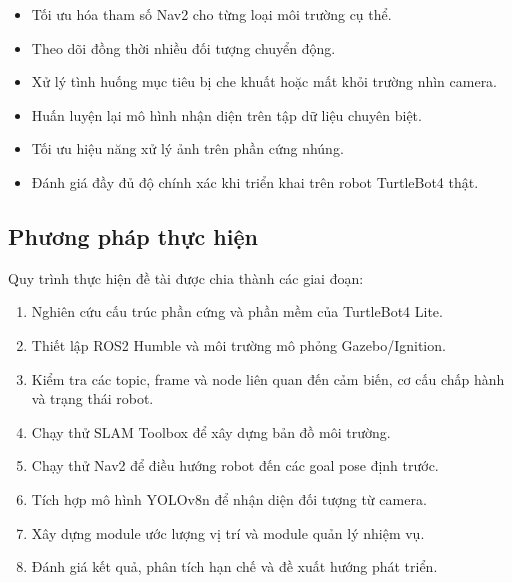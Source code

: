 \begin{itemize}
    \item Tối ưu hóa tham số Nav2 cho từng loại môi trường cụ thể.
    
    \item Theo dõi đồng thời nhiều đối tượng chuyển động.
    
    \item Xử lý tình huống mục tiêu bị che khuất hoặc mất khỏi trường nhìn camera.
    
    \item Huấn luyện lại mô hình nhận diện trên tập dữ liệu chuyên biệt.
    
    \item Tối ưu hiệu năng xử lý ảnh trên phần cứng nhúng.
    
    \item Đánh giá đầy đủ độ chính xác khi triển khai trên robot TurtleBot4 thật.
\end{itemize}

\subsection{Phương pháp thực hiện}

Quy trình thực hiện đề tài được chia thành các giai đoạn:

\begin{enumerate}
    \item Nghiên cứu cấu trúc phần cứng và phần mềm của TurtleBot4 Lite.
    
    \item Thiết lập ROS2 Humble và môi trường mô phỏng Gazebo/Ignition.
    
    \item Kiểm tra các topic, frame và node liên quan đến cảm biến, cơ cấu chấp hành và trạng thái robot.
    
    \item Chạy thử SLAM Toolbox để xây dựng bản đồ môi trường.
    
    \item Chạy thử Nav2 để điều hướng robot đến các goal pose định trước.
    
    \item Tích hợp mô hình YOLOv8n để nhận diện đối tượng từ camera.
    
    \item Xây dựng module ước lượng vị trí và module quản lý nhiệm vụ.
    
    \item Đánh giá kết quả, phân tích hạn chế và đề xuất hướng phát triển.
\end{enumerate}

